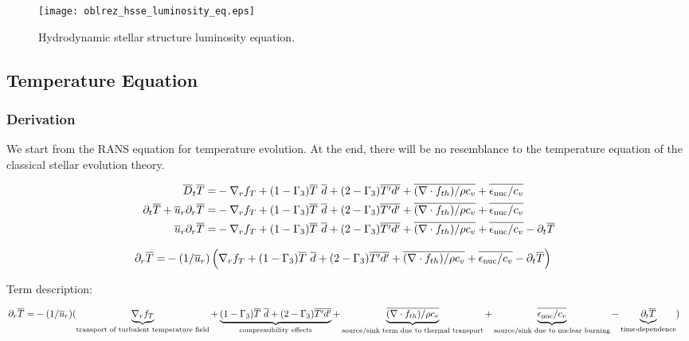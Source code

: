 \documentclass[10pt,paper=a4]{report}
\newcommand{\eht}{\overline}
\newcommand{\av}{\overline}
\begin{document}
\newpage

\begin{figure}[!h]
\centerline{
  \texttt{[image: oblrez\_hsse\_luminosity\_eq.eps]}}
\caption{Hydrodynamic stellar structure luminosity equation.}
\end{figure}


\subsection{Temperature Equation}

\subsubsection{Derivation}

We start from the RANS equation for temperature evolution. At the end, there will be no resemblance to the temperature equation of the  classical stellar evolution theory.

\begin{align}
  \av{D}_t \av{T} = & -\nabla_r f_T + (1-\Gamma_3)\eht{T}\ \eht{d} + (2-\Gamma_3)\eht{T'd'} + \eht{(\nabla \cdot f_{th}) / \rho c_v} + \eht{\epsilon_{\rm nuc} / c_v} \nonumber \\
  \partial_t \eht{T} + \eht{u}_r \partial_r \eht{T} = & -\nabla_r f_T + (1-\Gamma_3)\eht{T}\ \eht{d} + (2-\Gamma_3)\eht{T'd'} + \eht{(\nabla \cdot f_{th}) / \rho c_v} + \eht{\epsilon_{\rm nuc} / c_v}  \nonumber \\
 \eht{u}_r \partial_r \eht{T} = & -\nabla_r f_T + (1-\Gamma_3)\eht{T}\ \eht{d} + (2-\Gamma_3)\eht{T'd'} + \eht{(\nabla \cdot f_{th}) / \rho c_v} + \eht{\epsilon_{\rm nuc} / c_v} - \partial_t \eht{T} \nonumber 
\end{align}

\begin{align}
 \partial_r \eht{T} = & -(1/\eht{u}_r)\left(\nabla_r f_T + (1-\Gamma_3)\eht{T}\ \eht{d} + (2-\Gamma_3)\eht{T'd'} + \eht{(\nabla \cdot f_{th}) / \rho c_v} + \eht{\epsilon_{\rm nuc} / c_v} - \partial_t \eht{T} \right) \nonumber
\end{align}  

\noindent
Term description:

\begin{align}
 \partial_r \eht{T} = & -(1/\eht{u}_r)(\underbrace{\nabla_r f_T}_\text{transport of turbulent temperature field} + \underbrace{(1-\Gamma_3)\eht{T}\ \eht{d} + (2-\Gamma_3)\eht{T'd'}}_\text{compressibility effects} + \underbrace{\eht{(\nabla \cdot f_{th}) / \rho c_v}}_\text{source/sink term due to thermal transport} + \underbrace{\eht{\epsilon_{\rm nuc} / c_v}}_\text{source/sink due to nuclear burning} - \underbrace{\partial_t \eht{T}}_\text{time-dependence}) 
\end{align}
\end{document}
